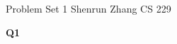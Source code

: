 \documentclass{article}
\begin{document}
\large %
\linespread{1.5} %


{\Large Problem Set {1}%
\hfill  Shenrun Zhang CS 229}

\vspace{0.5in}

%


{\large \bf Q1}\\
\end{document}
